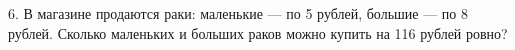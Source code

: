 6. В магазине продаются раки: маленькие --- по 5 рублей, большие --- по 8 рублей. Сколько маленьких и больших раков можно купить на 116 рублей ровно?\\
